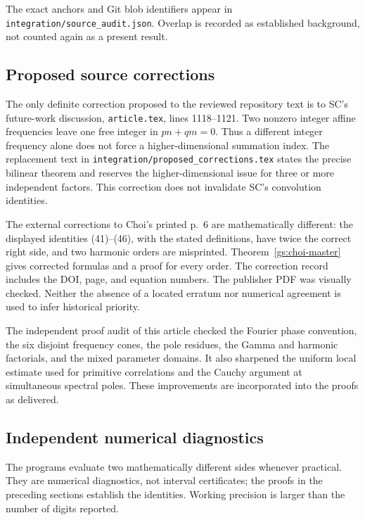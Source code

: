The exact anchors and Git blob identifiers appear in
\nolinkurl{integration/source_audit.json}.  Overlap is recorded as
established background, not counted again as a present result.

\subsection{Proposed source corrections}

The only definite correction proposed to the reviewed repository text
is to SC's future-work discussion, \nolinkurl{article.tex},
lines 1118--1121.  Two nonzero integer affine frequencies leave one free
integer in $pn+qm=0$.  Thus a different integer frequency alone does not
force a higher-dimensional summation index.  The replacement text in
\nolinkurl{integration/proposed_corrections.tex} states the precise
bilinear theorem and reserves the higher-dimensional issue for three
or more independent factors.  This correction does not invalidate
SC's convolution identities.

The external corrections to Choi's printed p.~6 are mathematically
different: the displayed identities (41)--(46), with the stated
definitions, have twice the correct right side, and two harmonic
orders are misprinted.  Theorem~\ref{gs:choi-master} gives corrected
formulas and a proof for every order.  The correction record includes
the DOI, page, and equation numbers.  The publisher PDF was visually
checked.  Neither the absence of a located erratum nor numerical
agreement is used to infer historical priority.

The independent proof audit of this article checked the Fourier phase
convention, the six disjoint frequency cones, the pole residues, the
Gamma and harmonic factorials, and the mixed parameter domains.  It
also sharpened the uniform local estimate used for primitive
correlations and the Cauchy argument at simultaneous spectral poles.
These improvements are incorporated into the proofs as delivered.



\subsection{Independent numerical diagnostics}

The programs evaluate two mathematically different sides whenever
practical.  They are numerical diagnostics, not interval certificates;
the proofs in the preceding sections establish the identities.
Working precision is larger than the number of digits reported.

